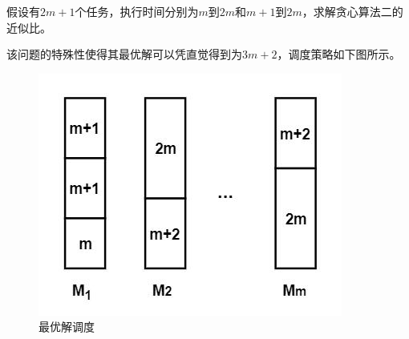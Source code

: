 \begin{example}
	假设有$2m+1$个任务，执行时间分别为$m$到$2m$和$m+1$到$2m$，求解贪心算法二的近似比。
\end{example}
该问题的特殊性使得其最优解可以凭直觉得到为$3m+2$，调度策略如下图所示。
\begin{figure}[hbt]
	\centering
	\includegraphics{image/example-problem-opt-solve.jpg}
	\caption{最优解调度}\label{fig:example-problem-opt-solve}
\end{figure}

